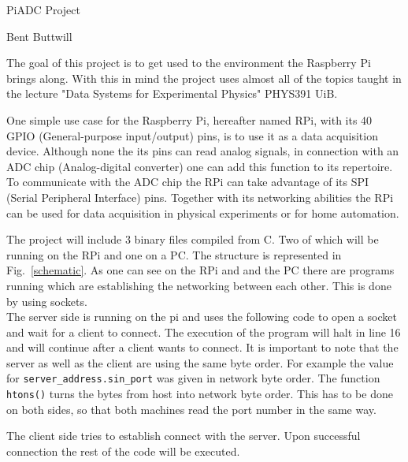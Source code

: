 \documentclass[12pt,paper=a4,twoside]{scrartcl}
\numberwithin{equation}{section}
\begin{document}
\vspace*{1cm}
\Large
\begin{center}
PiADC Project
\end{center}
\vspace{3mm}
\normalsize
\begin{center}
Bent Buttwill
\end{center}
\vspace{2cm}
The goal of this project is to get used to the environment the Raspberry Pi brings along. With this in mind the project uses almost all of the topics taught in the lecture "Data Systems for Experimental Physics" PHYS391 UiB. 

One simple use case for the Raspberry Pi, hereafter named RPi, with its 40 GPIO (General-purpose input/output) pins, is to use it as a data acquisition device.
 Although none the its pins can read analog signals, in connection with an ADC chip (Analog-digital converter) one can add this function to its repertoire. To communicate with the ADC chip the RPi can take advantage of its SPI (Serial Peripheral Interface) pins. Together with its networking abilities the RPi can be used for data acquisition in physical experiments or for home automation.

The project will include 3 binary files compiled from C. Two of which will be running on the RPi and one on a PC. The structure is represented in Fig.~\ref{schematic}. As one can see on the RPi and and the PC there are programs running which are establishing the networking between each other. This is done by using sockets.
\vspace{5mm}\\
The server side is running on the pi and uses the following code to open a socket and wait for a client to connect. The execution of the program will halt in line 16 and will continue after a client wants to connect. It is important to note that the server as well as the client are using the same byte order. For example the value for \verb+server_address.sin_port+ was given in network byte order. The function \verb+htons()+ turns the bytes from host into network byte order. This has to be done on both sides, so that both machines read the port number in the same way.



The client side tries to establish connect with the server. Upon successful connection the rest of the code will be executed.

\end{document}
